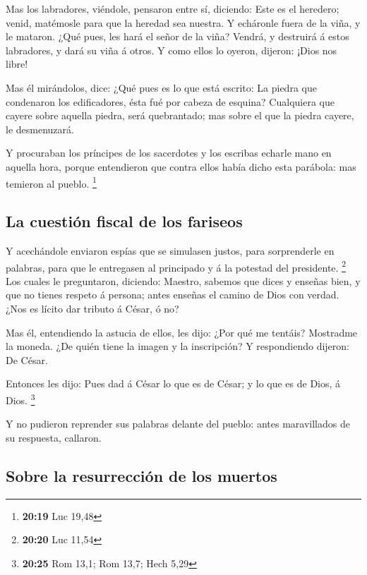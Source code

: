  Mas los labradores, viéndole, pensaron entre sí,
diciendo: Este es el heredero; venid, matémosle para que la heredad sea
nuestra.  Y echáronle fuera de la viña, y le mataron.
¿Qué pues, les hará el señor de la viña?  Vendrá, y
destruirá á estos labradores, y dará su viña á otros. Y como ellos lo
oyeron, dijeron: ¡Dios nos libre!

 Mas él mirándolos, dice: ¿Qué pues es lo que está
escrito: La piedra que condenaron los edificadores, ésta fué por cabeza
de esquina?  Cualquiera que cayere sobre aquella piedra,
será quebrantado; mas sobre el que la piedra cayere, le desmenuzará.

 Y procuraban los príncipes de los sacerdotes y los
escribas echarle mano en aquella hora, porque entendieron que contra
ellos había dicho esta parábola: mas temieron al pueblo. \footnote{\textbf{20:19}
  Luc 19,48}

\hypertarget{la-cuestiuxf3n-fiscal-de-los-fariseos}{%
\subsection{La cuestión fiscal de los
fariseos}\label{la-cuestiuxf3n-fiscal-de-los-fariseos}}

 Y acechándole enviaron espías que se simulasen justos,
para sorprenderle en palabras, para que le entregasen al principado y á
la potestad del presidente. \footnote{\textbf{20:20} Luc 11,54}
 Los cuales le preguntaron, diciendo: Maestro, sabemos
que dices y enseñas bien, y que no tienes respeto á persona; antes
enseñas el camino de Dios con verdad.  ¿Nos es lícito dar
tributo á César, ó no?

 Mas él, entendiendo la astucia de ellos, les dijo: ¿Por
qué me tentáis?  Mostradme la moneda. ¿De quién tiene la
imagen y la inscripción? Y respondiendo dijeron: De César.

 Entonces les dijo: Pues dad á César lo que es de César;
y lo que es de Dios, á Dios. \footnote{\textbf{20:25} Rom 13,1; Rom
  13,7; Hech 5,29}

 Y no pudieron reprender sus palabras delante del pueblo:
antes maravillados de su respuesta, callaron.

\hypertarget{sobre-la-resurrecciuxf3n-de-los-muertos}{%
\subsection{Sobre la resurrección de los
muertos}\label{sobre-la-resurrecciuxf3n-de-los-muertos}}

